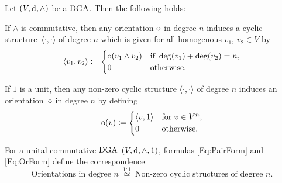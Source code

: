 \documentclass[\MainFolder/Text.tex]{subfiles}
\begin{document}
%
\begin{Proposition}\label{Prop:OrAndCyc}
Let $(V,\mathrm{d},\wedge)$ be a $\mathrm{DGA}$. Then the following holds:
\begin{ClaimList}
\item If $\wedge$ is commutative, then any orientation $\mathrm{o}$ in degree $n$ induces a cyclic structure~$\langle\cdot,\cdot\rangle$ of degree $n$ which is given for all homogenous $v_1$, $v_2\in V$ by
\begin{equation}\label{Eq:PairForm}
\langle v_1, v_2 \rangle \coloneqq \begin{cases}
    \mathrm{o}(v_1 \wedge v_2) & \text{if }\deg(v_1) + \deg(v_2) = n, \\
    0 & \text{otherwise}. \end{cases}
\end{equation}
\item If $1$ is a unit, then any non-zero cyclic structure $\langle\cdot,\cdot\rangle$ of degree $n$ induces an orientation~$\mathrm{o}$ in degree $n$ by defining 
\begin{equation}\label{Eq:OrForm}
\mathrm{o}(v) \coloneqq \begin{cases}
 \langle v, 1 \rangle & \text{for }v\in V^n,\\
 0 & \text{otherwise.}
 \end{cases}
\end{equation}
\item For a unital commutative $\mathrm{DGA}$ $(V,\mathrm{d},\wedge,1)$, formulas \eqref{Eq:PairForm} and \eqref{Eq:OrForm} define the correspondence
$$ \text{Orientations in degree }n\ \overset{1:1}{\simeq}\ \text{Non-zero cyclic structures of degree }n.$$
\end{ClaimList}
\end{Proposition}
\end{document}
